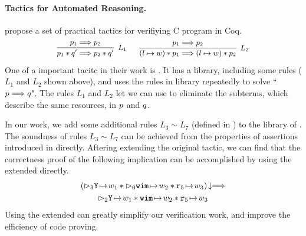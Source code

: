 \paragraph{\textbf{Tactics for Automated Reasoning.}} 
\cite{practical-tactics} propose a set of practical tactics 
for verifiying C program in Coq. 
\[
    \small
    \infer[L_1]
    {
        \astP_1 \sepstar \astQ' \Longrightarrow \astP_2 \sepstar \astQ'
    }
    {
        \astP_1 \Longrightarrow \astP_2
    } \quad \ \  
    \infer[L_2]
    {
        (\sepsto{\loc}{\word}) \sepstar \astP_1 \Longrightarrow 
        (\sepsto{\loc}{\word}) \sepstar \astP_2
    }
    {
        \astP_1 \Longrightarrow \astP_2
    }
\]
One of a important tacitc in their work is \sepcancel{}. 
It has a library, including some rules (\eg{} $L_1$ and $L_2$ shown above), 
and uses the rules in library repeatedly to solve 
``$p \Longrightarrow q$". The rules $L_1$ and $L_2$  
let we can use \sepcancel{} to eliminate the 
subterms, which describe the same resources, 
in $p$ and $q$.

In our work, we add some additional rules $L_3 \sim L_7$ 
(defined in \Fig{\ref{fig:ext-rule-tac-sepcancel}})
to the library of \sepcancel{}. The soundness of rules $L_3 \sim L_7$ 
can be achieved from the properties of assertions introduced in 
\Sec{\ref{subsec:assertions}} directly. Aftering extending the original 
\sepcancel{} tactic, we can find that the correctness proof
of the following implication can be accomplished by using 
the extended \sepcancel{} directly.
\begin{multline*}
    \nxtAst{(\dlyregst{3}{\regY}{\word_1} \sepstar 
    \dlyregst{0}{\regwim}{\word_2} \sepstar 
    \regst{\reg{5}}{\word_3})} \Longrightarrow \\
    \dlyregst{2}{\regY}{\word_1} \sepstar 
    \regst{\regwim}{\word_2} \sepstar 
    \regst{\reg{5}}{\word_3}
\end{multline*}
Using the extended \sepcancel{} can greatly simplify our verification 
work, and improve the efficiency of code proving. 

